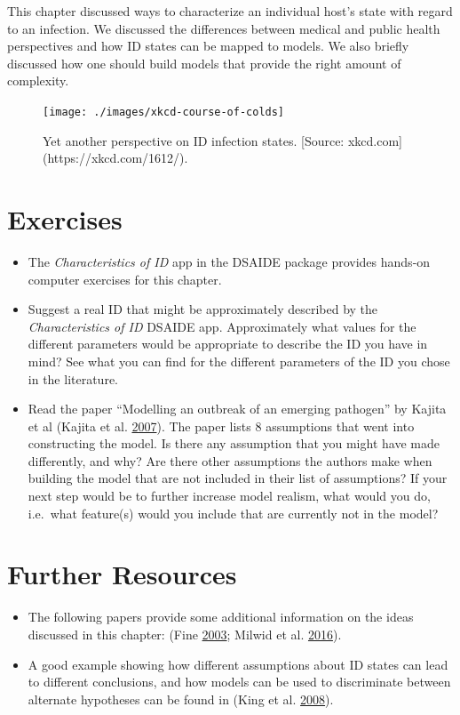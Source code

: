 \documentclass[
]{book}
\providecommand{\tightlist}{%
  \setlength{\itemsep}{0pt}\setlength{\parskip}{0pt}}
\begin{document}
This chapter discussed ways to characterize an individual host's state with regard to an infection. We discussed the differences between medical and public health perspectives and how ID states can be mapped to models. We also briefly discussed how one should build models that provide the right amount of complexity.

\begin{figure}
\texttt{[image: ./images/xkcd-course-of-colds]} \caption{Yet another perspective on ID infection states. [Source: xkcd.com](https://xkcd.com/1612/).}\label{fig:coldcourse}
\end{figure}

\hypertarget{exercises-1}{%
\section{Exercises}\label{exercises-1}}

\begin{itemize}
\tightlist
\item
  The \emph{Characteristics of ID} app in the DSAIDE package provides hands-on computer exercises for this chapter.
\item
  Suggest a real ID that might be approximately described by the \emph{Characteristics of ID} DSAIDE app. Approximately what values for the different parameters would be appropriate to describe the ID you have in mind? See what you can find for the different parameters of the ID you chose in the literature.
\item
  Read the paper ``Modelling an outbreak of an emerging pathogen'' by Kajita et al (Kajita et al. \protect\hyperlink{ref-kajita07}{2007}). The paper lists 8 assumptions that went into constructing the model. Is there any assumption that you might have made differently, and why? Are there other assumptions the authors make when building the model that are not included in their list of assumptions? If your next step would be to further increase model realism, what would you do, i.e.~what feature(s) would you include that are currently not in the model?
\end{itemize}

\hypertarget{further-resources-1}{%
\section{Further Resources}\label{further-resources-1}}

\begin{itemize}
\tightlist
\item
  The following papers provide some additional information on the ideas discussed in this chapter: (Fine \protect\hyperlink{ref-fine03}{2003}; Milwid et al. \protect\hyperlink{ref-milwid16}{2016}).
\item
  A good example showing how different assumptions about ID states can lead to different conclusions, and how models can be used to discriminate between alternate hypotheses can be found in (King et al. \protect\hyperlink{ref-king08}{2008}).
\end{itemize}
\end{document}
